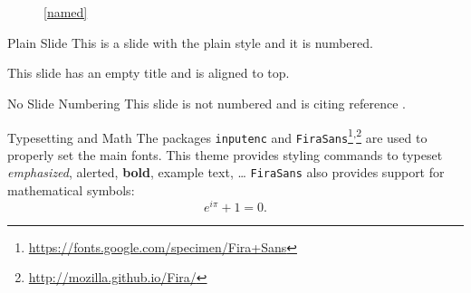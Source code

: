 \documentclass{beamer}
\begin{document}
\begin{frame}[plain]
\begin{figure}[!t]
  \captionsetup[subfloat]{position=top,labelformat=empty}
  \centering
    \subfloat[]{  \resizebox{0.4\textwidth}{!}{}}
    \subfloat[]{  \resizebox{0.4\textwidth}{!}{}}\\
  \vspace{-1cm}
    \subfloat[]{  \resizebox{0.4\textwidth}{!}{}} \\
    \ref{named}
\end{figure}
\end{frame}

\begin{frame}[plain]{Plain Slide}
	This is a slide with the plain style and it is numbered.
\end{frame}


\begin{frame}[t]
	This slide has an empty title and is aligned to top.
\end{frame}


\begin{frame}[noframenumbering]{No Slide Numbering}
	This slide is not numbered and is citing reference \cite{knuth74}.
\end{frame}


\begin{frame}{Typesetting and Math}
	The packages \texttt{inputenc} and \texttt{FiraSans}\footnote{\url{https://fonts.google.com/specimen/Fira+Sans}}\textsuperscript{,}\footnote{\url{http://mozilla.github.io/Fira/}} are used to properly set the main fonts.
	\vfill
	This theme provides styling commands to typeset \emph{emphasized}, \alert{alerted}, \textbf{bold}, \textcolor{example}{example text}, \dots
	\vfill
	\texttt{FiraSans} also provides support for mathematical symbols:
	\begin{equation*}
		e^{i\pi} + 1 = 0.
	\end{equation*}
\end{frame}
\end{document}
